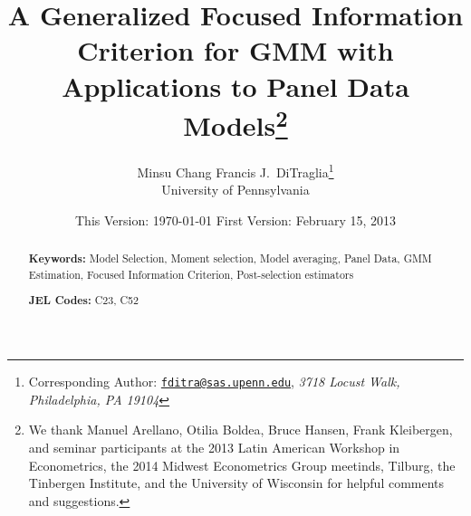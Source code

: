 \documentclass[12pt]{article}
\begin{document}
\title{A Generalized Focused Information Criterion for GMM with Applications to Panel Data Models\footnote{We thank Manuel Arellano, Otilia Boldea, Bruce Hansen, Frank Kleibergen, and seminar participants at the 2013 Latin American Workshop in Econometrics, the 2014 Midwest Econometrics Group meetinds, Tilburg, the Tinbergen Institute, and the University of Wisconsin for helpful comments and suggestions.}}

\author{Minsu Chang \hspace{1em} Francis J.\ DiTraglia\footnote{Corresponding Author:
\href{mailto:fditra@sas.upenn.edu}{\texttt{fditra@sas.upenn.edu}}, \emph{3718 Locust Walk, Philadelphia, PA 19104}}
\\ University of Pennsylvania}

\date{\footnotesize This Version: \today \hspace{0.5em} First Version: February 15, 2013}

\maketitle 
\begin{abstract}
	

	\bigskip
	\noindent\textbf{Keywords:} 
  Model Selection, Moment selection, Model averaging, Panel Data, GMM Estimation, Focused Information Criterion, Post-selection estimators

	\medskip
	\noindent\textbf{JEL Codes:} C23, C52 
\end{abstract}








%
%
%





\appendix
\singlespacing





\end{document}
